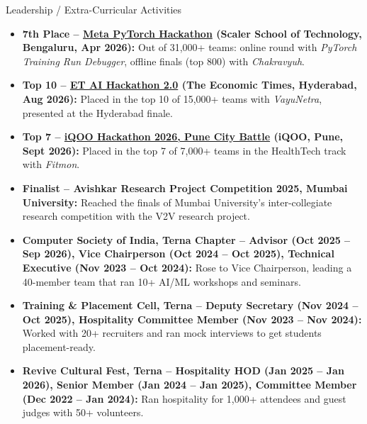 \documentclass{resume} %
\begin{document}
\begin{rSection}{Leadership / Extra-Curricular Activities}

\begin{itemize}

    \item {\bf 7th Place -- \href{https://www.scaler.com/school-of-technology/meta-pytorch-hackathon}{Meta PyTorch Hackathon} (Scaler School of Technology, Bengaluru, Apr 2026):} Out of 31,000+ teams: online round with \textit{PyTorch Training Run Debugger}, offline finals (top 800) with \textit{Chakravyuh}.

    \item {\bf Top 10 -- \href{https://economictimes.indiatimes.com/et-ai-hackathon/2nd-edition}{ET AI Hackathon 2.0} (The Economic Times, Hyderabad, Aug 2026):} Placed in the top 10 of 15,000+ teams with \textit{VayuNetra}, presented at the Hyderabad finale.

    \item {\bf Top 7 -- \href{https://iqoo.reskilll.com/}{iQOO Hackathon 2026, Pune City Battle} (iQOO, Pune, Sept 2026):} Placed in the top 7 of 7,000+ teams in the HealthTech track with \textit{Fitmon}.

    \item {\bf Finalist -- Avishkar Research Project Competition 2025, Mumbai University:} Reached the finals of Mumbai University's inter-collegiate research competition with the V2V research project.

    \item {\bf Computer Society of India, Terna Chapter -- Advisor (Oct 2025 -- Sep 2026), Vice Chairperson (Oct 2024 -- Oct 2025), Technical Executive (Nov 2023 -- Oct 2024):} Rose to Vice Chairperson, leading a 40-member team that ran 10+ AI/ML workshops and seminars.

    \item {\bf Training \& Placement Cell, Terna -- Deputy Secretary (Nov 2024 -- Oct 2025), Hospitality Committee Member (Nov 2023 -- Nov 2024):} Worked with 20+ recruiters and ran mock interviews to get students placement-ready.

    \item {\bf Revive Cultural Fest, Terna -- Hospitality HOD (Jan 2025 -- Jan 2026), Senior Member (Jan 2024 -- Jan 2025), Committee Member (Dec 2022 -- Jan 2024):} Ran hospitality for 1,000+ attendees and guest judges with 50+ volunteers.

\end{itemize}

\end{rSection}
\end{document}
